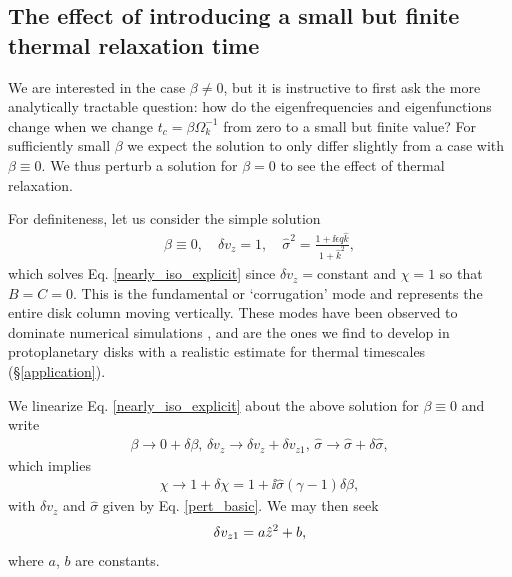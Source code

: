 \subsection{The effect of introducing a small but finite
  thermal relaxation time}\label{relax_pert}
We are interested in the case $\beta\neq 0$, but it is instructive to
first ask  the more analytically tractable question: how 
do the eigenfrequencies and eigenfunctions change when we change
$t_c=\beta\Omega_k^{-1}$ from zero to a small but finite value? For 
sufficiently small $\beta$ %
we expect the solution to only differ slightly from a case with
$\beta\equiv 0$. We thus perturb a solution for $\beta=0$ to see the
effect of thermal relaxation.  

For definiteness, let us consider the simple solution 
\begin{align}
  \beta\equiv 0, \quad \delta v_z = 1,\quad \hat{\sigma}^2 = \frac{1 +
  \ii\epsilon q \hat{k}}{1+\hat{k}^2}, \label{pert_basic} 
\end{align}
which solves Eq. \ref{nearly_iso_explicit} since $\delta
v_z=$constant and $\chi=1$ so that $B=C=0$. 
This is the fundamental or `corrugation' mode and represents
the entire disk column moving vertically. These modes have been
observed to dominate numerical simulations \citep{nelson13,stoll14},
and are the ones we find to develop in protoplanetary disks
with a realistic estimate for thermal timescales
(\S\ref{application}). 

We linearize Eq. \ref{nearly_iso_explicit} about the above
solution for $\beta\equiv0$ and write 
\begin{align}\label{nearly_iso_pert}
  \beta \to 0 + \delta\beta,\, \delta v_z\to \delta v_z+\delta
  v_{z1},\,\hat{\sigma} \to \hat{\sigma} + \delta\hat{\sigma}, 
\end{align}
which implies 
\begin{align}
  \chi \to 1 + \delta\chi = 1 + \ii \hat{\sigma}\left(\gamma-1\right)\delta\beta,
\end{align}
with $\delta v_z$ and $\hat{\sigma}$ given by Eq. \ref{pert_basic}. We
may then seek  
\begin{align}
  \delta v_{z1} = a \hat{z}^2 + b,
\end{align}
where $a$, $b$ are constants. 

